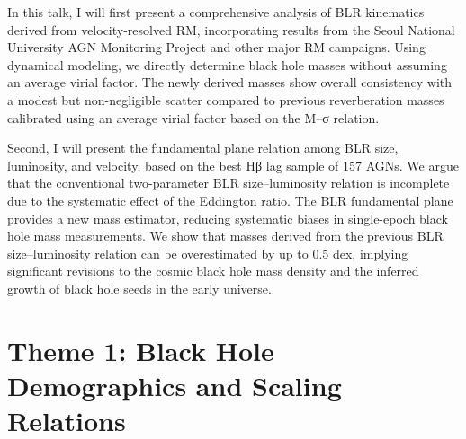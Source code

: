 In this talk, I will first present a comprehensive analysis of BLR kinematics derived from velocity-resolved RM, incorporating results from the Seoul National University AGN Monitoring Project and other major RM campaigns. Using dynamical modeling, we directly determine black hole masses without assuming an average virial factor. The newly derived masses show overall consistency with a modest but non-negligible scatter compared to previous reverberation masses calibrated using an average virial factor based on the M–σ relation.

Second, I will present the fundamental plane relation among BLR size, luminosity, and velocity, based on the best Hβ lag sample of 157 AGNs. We argue that the conventional two-parameter BLR size–luminosity relation is incomplete due to the systematic effect of the Eddington ratio. The BLR fundamental plane provides a new mass estimator, reducing systematic biases in single-epoch black hole mass measurements. We show that masses derived from the previous BLR size–luminosity relation can be overestimated by up to 0.5 dex, implying significant revisions to the cosmic black hole mass density and the inferred growth of black hole seeds in the early universe.


\hypertarget{abs-day-tuesday}{}

\section*{Theme 1: Black Hole Demographics and Scaling Relations}

\hypertarget{abs-25}{}
